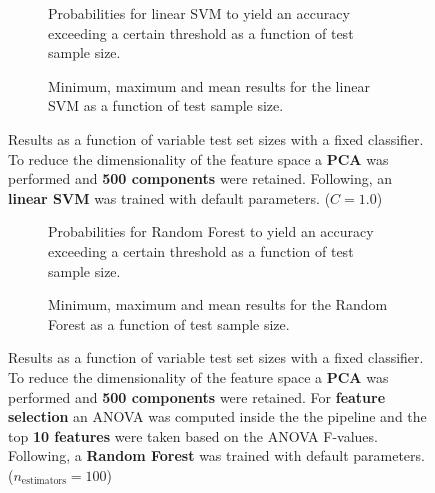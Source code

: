 \begin{figure}
    \captionsetup[subfigure]{justification=justified,singlelinecheck=false}
    \begin{subfigure}[t]{0.61\textwidth}
        
        \caption{Probabilities for linear SVM to yield an accuracy exceeding a certain threshold as a function of test sample size.}
    \end{subfigure}
    \hspace{3.0mm}
    \begin{subfigure}[t]{0.34\textwidth}
        
        \caption{Minimum, maximum and mean results for the linear SVM as a function of test sample size.}
    \end{subfigure}
    \caption[Effects of varying test sample size. Linear SVM; Preprocessing: PCA ($n_\text{components} = \num{500}$)]{Results as a function of variable test set sizes with a fixed classifier. To reduce the dimensionality of the feature space a \textbf{PCA} was performed and \textbf{\num{500} components} were retained. Following, an \textbf{{linear SVM}} was trained with default parameters. ($C=\num{1.0}$)}
    \label{fig:PCA_500_components_no_selection_LinearSVC}
\end{figure}

\begin{figure}
    \captionsetup[subfigure]{justification=justified,singlelinecheck=false}
    \begin{subfigure}[t]{0.61\textwidth}
        
        \caption{Probabilities for Random Forest to yield an accuracy exceeding a certain threshold as a function of test sample size.}
    \end{subfigure}
    \hspace{3.0mm}
    \begin{subfigure}[t]{0.34\textwidth}
        
        \caption{Minimum, maximum and mean results for the Random Forest as a function of test sample size.}
    \end{subfigure}
    \caption[Effects of varying test sample size. Random Forest; Preprocessing: PCA ($n_\text{components} = \num{500}$); ANOVA feature selection ($k_\text{best} = \num{10}$)]{Results as a function of variable test set sizes with a fixed classifier. To reduce the dimensionality of the feature space a \textbf{PCA} was performed and \textbf{\num{500} components} were retained. For \textbf{feature selection} an ANOVA was computed inside the the pipeline and the top \textbf{\num{10} features} were taken based on the ANOVA F-values. Following, a \textbf{{Random Forest}} was trained with default parameters. ($n_\text{estimators}=\num{100}$)}
    \label{fig:PCA_500_components_10_best_selected_RandomForest}
\end{figure}

